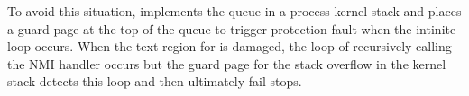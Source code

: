 To avoid this situation, {\sysname} implements the queue in a process kernel stack and places a guard page at the top of the queue to trigger protection fault when the intinite loop occurs.
When the text region for {\nmiq} is damaged, the loop of recursively calling the NMI handler occurs but the guard page for the stack overflow in the kernel stack detects this loop and then {\sysname} ultimately fail-stops.




